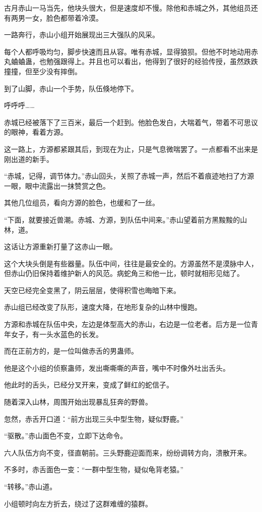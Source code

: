 \begin{this_body}
古月赤山一马当先，他块头很大，但是速度却不慢。除他和赤城之外，其他组员还有两男一女，脸色都带着冷漠。

一路奔行，赤山小组开始展现出三大强队的风采。

每个人都呼吸均匀，脚步快速而且从容。唯有赤城，显得狼狈。但他不时地动用赤丸蛐蛐蛊，也勉强跟得上。并且也可以看出，他得到了很好的经验传授，虽然跌跌撞撞，但至少没有摔倒。

到了山脚，赤山一个手势，队伍倏地停下。

呼呼呼……

赤城已经被落下了三百米，最后一个赶到。他脸色发白，大喘着气，带着不可思议的眼神，看着方源。

这一路上，方源都紧跟其后，到现在为止，只是气息微喘罢了。一点都看不出来是刚出道的新手。

“赤城，记得，调节体力。”赤山回头，关照了赤城一声，然后不着痕迹地扫了方源一眼，眼中流露出一抹赞赏之色。

其他几位组员，看向方源的脸色，也缓和了一丝。

“下面，就要接近兽潮。赤城、方源，到队伍中间来。”赤山望着前方黑黢黢的山林，道。

这话让方源重新打量了这赤山一眼。

这个大块头倒是有些器量。队伍中间，往往是最安全的。方源虽然不是漠脉中人，但赤山仍旧保持着维护新人的风范。病蛇角三和他一比，顿时就相形见绌了。

天空已经完全变黑了，阴云层层，使得积雪也晦暗下来。

赤山组已经改变了队形，速度大降，在地形复杂的山林中慢跑。

方源和赤城在队伍中央，左边是体型高大的赤山，右边是一位老者。后方是一位青年女子，有一头水蓝色的长发。

而在正前方的，是一位叫做赤舌的男蛊师。

他是这个小组的侦察蛊师，发出嘶嘶嘶的声音，嘴中不时像外吐出舌头。

他此时的舌头，已经分叉开来，变成了鲜红的蛇信子。

随着深入山林，周围开始出现暴乱狂奔的野兽。

忽然，赤舌开口道：“前方出现三头中型生物，疑似野鹿。”

“驱散。”赤山面色不变，立即下达命令。

六人队伍方向不变，径直朝前。三头野鹿迎面而来，纷纷调转方向，溃散开来。

不多时，赤舌面色一变：“一群中型生物，疑似龟背老猿。”

“转移。”赤山道。

小组顿时向左方折去，绕过了这群难缠的猿群。


\end{this_body}

